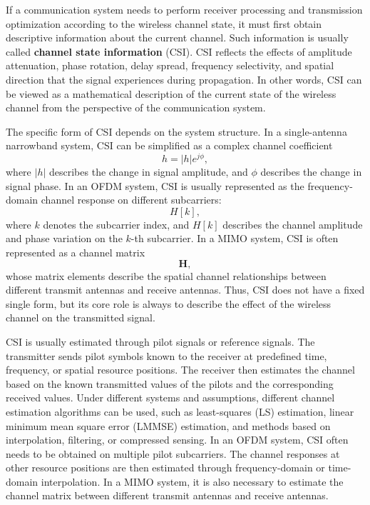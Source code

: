 
If a communication system needs to perform receiver processing and transmission optimization
according to the wireless channel state,
it must first obtain descriptive information about the current channel.
Such information is usually called \textbf{channel state information} (CSI).
CSI reflects the effects of amplitude attenuation,
phase rotation,
delay spread,
frequency selectivity,
and spatial direction that the signal experiences during propagation.
In other words,
CSI can be viewed as a mathematical description of the current state of the wireless channel
from the perspective of the communication system.

The specific form of CSI depends on the system structure.
In a single-antenna narrowband system,
CSI can be simplified as a complex channel coefficient
\begin{equation}
    h
    =
    |h|e^{j\phi},
    \label{eq:csi-siso-coefficient}
\end{equation}
where
\(|h|\) describes the change in signal amplitude,
and \(\phi\) describes the change in signal phase.
In an OFDM system,
CSI is usually represented as the frequency-domain channel response on different subcarriers:
\begin{equation}
    H[k],
    \label{eq:csi-ofdm-subcarrier}
\end{equation}
where
\(k\) denotes the subcarrier index,
and \(H[k]\) describes the channel amplitude and phase variation on the \(k\)-th subcarrier.
In a MIMO system,
CSI is often represented as a channel matrix
\begin{equation}
    \mathbf{H},
    \label{eq:csi-mimo-matrix}
\end{equation}
whose matrix elements describe the spatial channel relationships
between different transmit antennas and receive antennas.
Thus, CSI does not have a fixed single form,
but its core role is always to describe the effect of the wireless channel on the transmitted signal.

CSI is usually estimated through pilot signals or reference signals.
The transmitter sends pilot symbols known to the receiver at predefined time,
frequency,
or spatial resource positions.
The receiver then estimates the channel based on the known transmitted values of the pilots
and the corresponding received values.
Under different systems and assumptions,
different channel estimation algorithms can be used,
such as least-squares (LS) estimation,
linear minimum mean square error (LMMSE) estimation,
and methods based on interpolation,
filtering,
or compressed sensing.
In an OFDM system,
CSI often needs to be obtained on multiple pilot subcarriers.
The channel responses at other resource positions are then estimated through frequency-domain or time-domain interpolation.
In a MIMO system,
it is also necessary to estimate the channel matrix between different transmit antennas and receive antennas.

